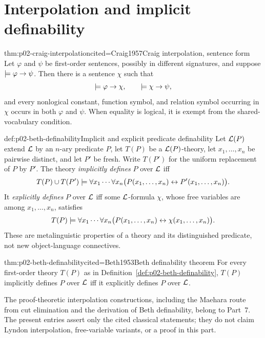 \section{Interpolation and implicit definability}
\label{sec:p02-craig-beth}

\begin{hbtheorem}{thm:p02-craig-interpolation}{cited=Craig1957}{Craig interpolation, sentence form}
Let \(\varphi\) and \(\psi\) be first-order sentences, possibly in different
signatures, and suppose \(\models\varphi\to\psi\).  Then there is a sentence
\(\chi\) such that
\[
 \models\varphi\to\chi,
 \qquad
 \models\chi\to\psi,
\]
and every nonlogical constant, function symbol, and relation symbol occurring
in \(\chi\) occurs in both \(\varphi\) and \(\psi\).  When equality is logical,
it is exempt from the shared-vocabulary condition.
\end{hbtheorem}

\begin{hbdefinition}{def:p02-beth-definability}{Implicit and explicit predicate definability}
Let \(\mathcal{L}(P)\) extend \(\mathcal{L}\) by an \(n\)-ary predicate \(P\),
let \(T(P)\) be a \(\mathcal{L}(P)\)-theory, let
\(x_1,\ldots,x_n\) be pairwise distinct, and let \(P'\) be fresh.
Write \(T(P')\) for the uniform replacement of \(P\) by \(P'\).  The theory
\emph{implicitly defines} \(P\) over \(\mathcal{L}\) iff
\[
 T(P)\cup T(P')\models
 \forall x_1\cdots\forall x_n
 \bigl(P(x_1,\ldots,x_n)\leftrightarrow
       P'(x_1,\ldots,x_n)\bigr).
\]
It \emph{explicitly defines} \(P\) over \(\mathcal{L}\) iff some
\(\mathcal{L}\)-formula \(\chi\), whose free variables are among
\(x_1,\ldots,x_n\), satisfies
\[
 T(P)\models
 \forall x_1\cdots\forall x_n
 \bigl(P(x_1,\ldots,x_n)\leftrightarrow
       \chi(x_1,\ldots,x_n)\bigr).
\]
These are metalinguistic properties of a theory and its distinguished
predicate, not new object-language connectives.
\end{hbdefinition}

\begin{hbtheorem}{thm:p02-beth-definability}{cited=Beth1953}{Beth definability theorem}
For every first-order theory \(T(P)\) as in
Definition~\ref{def:p02-beth-definability}, \(T(P)\) implicitly defines \(P\)
over \(\mathcal{L}\) iff it explicitly defines \(P\) over \(\mathcal{L}\).
\end{hbtheorem}

The proof-theoretic interpolation constructions, including the Maehara route
from cut elimination and the derivation of Beth definability, belong to Part~7.
The present entries assert only the cited classical statements; they do not
claim Lyndon interpolation, free-variable variants, or a proof in this part.

